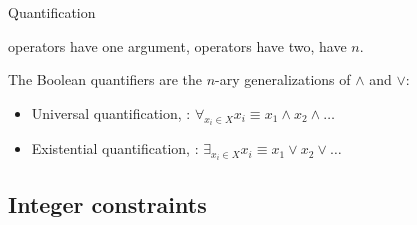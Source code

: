 \documentclass{cons-beamer}
\begin{document}
\begin{frame}{Quantification}

	 operators have one argument,  operators have two,  have $n$.

	\parBreak

  The Boolean quantifiers are the $n$-ary generalizations of $\land$ and $\lor$:

	\parBreak

  \begin{itemize}
	  \item Universal quantification, \ie {}: $\forall_{x_i \in X}{x_i} \equiv x_1 \land x_2 \land \ldots$
	  \item Existential quantification, \ie {}: $\exists_{x_i \in X}{x_i} \equiv x_1 \lor x_2 \lor \ldots$
  \end{itemize}




\end{frame}


\subsection{Integer constraints}
\end{document}
